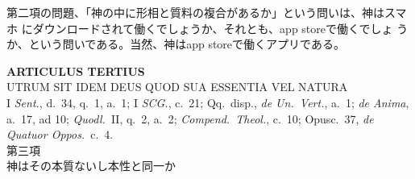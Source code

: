 \documentclass[paper=a4paper,fontsize=10pt,jafontsize=9pt,titlepage]{jlreq}
\begin{document}
第二項の問題、「神の中に形相と質料の複合があるか」という問いは、神はスマホ
にダウンロードされて働くでしょうか、それとも、app storeで働くでしょ
うか、という問いである。当然、神はapp storeで働くアプリである。



\newpage
{}

\begin{center}
 {\Large {\bfseries ARTICULUS TERTIUS}}\\
 {\large UTRUM SIT IDEM DEUS QUOD SUA ESSENTIA VEL NATURA}\\
 {\footnotesize I \textit{Sent.}, d.~34, q.~1, a.~1; I \textit{SCG.},
 c.~21; Qq.~disp., \textit{de Un.~Vert.}, a.~1; \textit{de Anima},
 a.~17, ad 10; \textit{Quodl.}~II, q.~2, a.~2; \textit{Compend.~Theol.},
 c.~10; Opusc.~37, \textit{de Quatuor Oppos.}~c.~4.}\\
{\Large 第三項\\神はその本質ないし本性と同一か}

\end{center}
\end{document}
